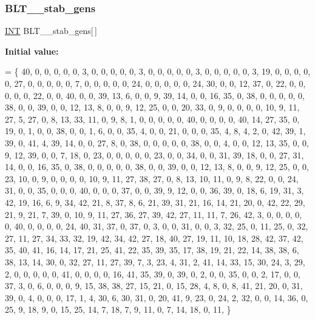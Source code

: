 \mbox{\label{data___b_l_t_8_c_a7f3e68e072db48eb6d2c8f96eb344df2}} 
\subsubsection{\texorpdfstring{B\+L\+T\+\_\+\_\+stab\+\_\+gens}{BLT\_43\_stab\_gens}}
{\footnotesize\ttfamily \mbox{\hyperlink{galois_8h_a09fddde158a3a20bd2dcadb609de11dc}{I\+NT}} B\+L\+T\+\_\+\_\+stab\+\_\+gens\mbox{[}$\,$\mbox{]}}

{\bfseries Initial value\+:}
\begin{DoxyCode}
= \{
40,  0,  0,  0,  0,  0,  3,  0,  0,  0,  0,  0,  3,  0,  0,  0,  0,  0,  3,  0,  0,  0,  0,  0,  3, 
19,  0,  0,  0,  0,  0, 27,  0,  0,  0,  0,  0,  7,  0,  0,  0,  0,  0, 24,  0,  0,  0,  0,  0, 24, 
30,  0,  0, 12, 37,  0, 22,  0,  0,  0,  0,  0, 22,  0,  0, 40,  0,  0, 39, 13,  6,  0,  0,  9, 39, 
14,  0,  0, 16, 35,  0, 38,  0,  0,  0,  0,  0, 38,  0,  0, 39,  0,  0, 12, 13,  8,  0,  0,  9, 12, 
25,  0,  0, 20, 33,  0,  9,  0,  0,  0,  0, 10,  9, 11, 27,  5, 27,  0,  8, 13, 33, 11,  0,  9,  8, 
 1,  0,  0,  0,  0,  0, 40,  0,  0,  0,  0, 40, 14, 27, 35,  0, 19,  0,  1,  0,  0, 38,  0,  0,  1, 
 6,  0,  0, 35,  4,  0,  0, 21,  0,  0,  0, 35,  4,  8,  4,  2,  0, 42, 39,  1, 39,  0, 41,  4, 39, 
14,  0,  0, 27,  8,  0, 38,  0,  0,  0,  0,  0, 38,  0,  0,  4,  0,  0, 12, 13, 35,  0,  0,  9, 12, 
39,  0,  0,  7, 18,  0, 23,  0,  0,  0,  0,  0, 23,  0,  0, 34,  0,  0, 31, 39, 18,  0,  0, 27, 31, 
14,  0,  0, 16, 35,  0, 38,  0,  0,  0,  0,  0, 38,  0,  0, 39,  0,  0, 12, 13,  8,  0,  0,  9, 12, 
25,  0,  0, 23, 10,  0,  9,  0,  0,  0,  0, 10,  9, 11, 27, 38, 27,  0,  8, 13, 10, 11,  0,  9,  8, 
22,  0,  0, 24, 31,  0,  0, 35,  0,  0,  0, 40,  0,  0,  0, 37,  0,  0, 39,  9, 12,  0,  0, 36, 39, 
 0, 18,  6, 19, 31,  3, 42, 19, 16,  6,  9, 34, 42, 21,  8, 37,  8,  6, 21, 39, 31, 21, 16, 14, 21, 
20,  0, 42, 22, 29, 21,  9, 21,  7, 39,  0, 10,  9, 11, 27, 36, 27, 39, 42, 27, 11, 11,  7, 26, 42, 
 3,  0,  0,  0,  0,  0, 40,  0,  0,  0,  0, 24, 40, 31, 37,  0, 37,  0,  3,  0,  0, 31,  0,  0,  3, 
32, 25,  0, 11, 25,  0, 32, 27, 11, 27, 34, 33, 32, 19, 42, 34, 42, 27, 18, 40, 27, 19, 11, 10, 18, 
28, 42, 37, 42, 35, 40, 41, 16, 14, 17, 21, 25, 41, 22, 35, 39, 35, 17, 38, 19, 21, 22, 14, 38, 38, 
 6, 38, 13, 14, 30,  0, 32, 27, 11, 27, 39,  7,  3, 23,  4, 31,  2, 41, 14, 33, 15, 30, 24,  3, 29, 
 2,  0,  0,  0,  0,  0, 41,  0,  0,  0,  0, 16, 41, 35, 39,  0, 39,  0,  2,  0,  0, 35,  0,  0,  2, 
17,  0,  0, 37,  3,  0,  6,  0,  0,  0,  9, 15, 38, 38, 27, 15, 21,  0, 15, 28,  4,  8,  0,  8, 41, 
21, 20,  0, 31, 39,  0,  4,  0,  0,  0, 17,  1,  4, 30,  6, 30, 31,  0, 20, 41,  9, 23,  0, 24,  2, 
32,  0,  0, 14, 36,  0, 25,  9, 18,  9,  0, 15, 25, 14,  7, 18,  7,  9, 11,  0,  7, 14, 18,  0, 11, 
\}
\end{DoxyCode}
